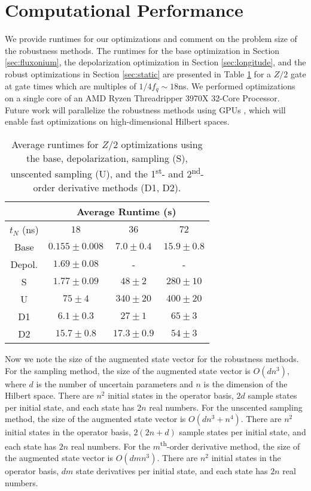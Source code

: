 \section{Computational Performance \label{appendix:time}}
We provide runtimes for our optimizations and comment on the problem size of the
robustness methods. The runtimes for
the base optimization in Section \ref{sec:fluxonium},
the depolarization optimization in Section \ref{sec:longitude},
and the robust optimizations in Section \ref{sec:static}
are presented in Table \ref{tab:time}
for a $Z/2$ gate at gate times which are multiples of $1/4f_{q} \sim 18$ns.
We performed optimizations on a single core of
an AMD Ryzen Threadripper 3970X 32-Core Processor.
Future work will parallelize the robustness methods using GPUs
\cite{leung2017speedup},
which will enable fast optimizations on high-dimensional Hilbert spaces.

\begin{table}[H]
  \centering
  \begin{tabular} {c | c | c | c }
    & \multicolumn{3}{c}{Average Runtime (s)}\\
    \hline
    $t_{N}$ (ns) & $18$ & $36$ & $72$\\
    \hline
    Base & $0.155 \pm 0.008$ & $7.0 \pm 0.4$ & $15.9 \pm 0.8$\\
    Depol. & $1.69 \pm 0.08$ & - & -\\
    S & $1.77 \pm 0.09$ & $48 \pm 2$ & $280 \pm 10$\\
    U & $75 \pm 4$ & $340 \pm 20$ & $400 \pm 20$\\
    D1 & $6.1 \pm 0.3$ & $27 \pm 1$ & $65 \pm 3$\\
    D2 & $15.7 \pm 0.8$ & $17.3 \pm 0.9$ & $54 \pm 3$\\
  \end{tabular}
  \caption{
    Average runtimes for $Z/2$ optimizations
    using the base, depolarization, sampling (S),
    unscented sampling (U), and the 1\textsuperscript{st}-
    and 2\textsuperscript{nd}-order derivative methods (D1, D2).
  }
  \label{tab:time}
\end{table}

Now we note the size of the augmented state vector for the robustness methods.
For the sampling method, the size of the augmented state vector
is $O(dn^{3})$, where $d$ is the number of uncertain parameters and
$n$ is the dimension of the Hilbert space. There are $n^{2}$ initial states
in the operator basis, $2d$ sample states per initial state,
and each state has $2n$ real numbers.
For the unscented sampling method, the size of the augmented state vector
is $O(dn^{3} + n^{4})$.
There are $n^{2}$ initial states in the operator basis,
$2(2n + d)$ sample states per initial state,
and each state has $2n$ real numbers.
For the $m$\textsuperscript{th}-order derivative method, the size of the augmented state vector
is $O(dmn^{3})$. There are $n^{2}$
initial states in the operator basis, $dm$ state derivatives per initial state,
and each state has $2n$ real numbers.
